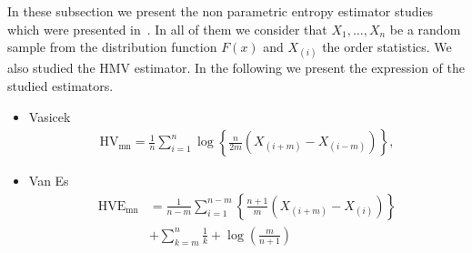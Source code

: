 \documentclass[journal]{IEEEtran}
\begin{document}
In these subsection we present the non parametric entropy estimator studies which were presented in~\cite{AlOmari2013}. In all of them we consider that $X_1,\ldots,X_n$ be a random sample from the distribution function $F(x)$ and $X_{(i)}$ the order statistics. We also studied the HMV estimator.
In the following we present the expression of the studied estimators. 
\vspace{3mm}
\begin{itemize}
	\item Vasicek
	 \begin{align}
	 	\label{HV}
		\text{HV}_\text{{mn}}=\frac{1}{n} \sum_{i=1}^{n} \log \left\{\frac{n}{2 m}\left(X_{(i+m)}-X_{(i-m)}\right)\right\},
	\end{align}

\vspace{3mm}
	\item Van Es
	\begin{align}
		\label{HVE}
		\text{HVE}_\text{{mn}}&=\frac{1}{n-m} \sum_{i=1}^{n-m}\left\{\frac{n+1}{m}\left(X_{(i+m)}-X_{(i)}\right)\right\} \nonumber\\
		        &+\sum_{k=m}^{n} \frac{1}{k}+\log \left(\frac{m}{n+1}\right)
	\end{align}



\end{itemize}
\end{document}
